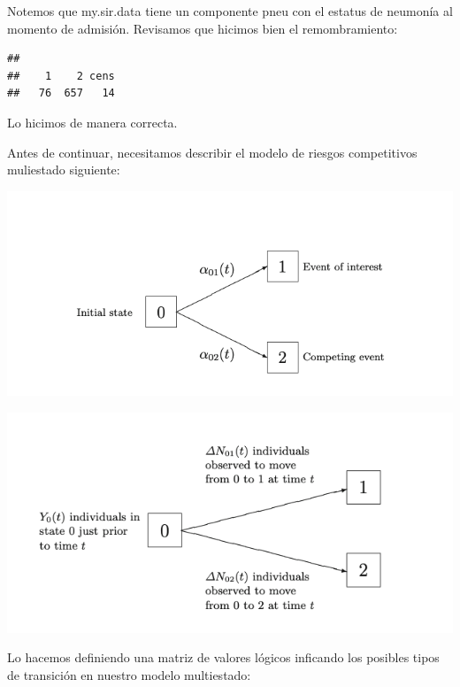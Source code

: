 \documentclass[
]{article}
\newenvironment{Shaded}{\begin{snugshade}}{\end{snugshade}}
\newcommand{\FunctionTok}[1]{\textcolor[rgb]{0.00,0.00,0.00}{#1}}
\newcommand{\NormalTok}[1]{#1}
\newcommand{\SpecialCharTok}[1]{\textcolor[rgb]{0.00,0.00,0.00}{#1}}
\begin{document}
Notemos que my.sir.data tiene un componente pneu con el estatus de
neumonía al momento de admisión. Revisamos que hicimos bien el
remombramiento:

\begin{Shaded}
\end{Shaded}

\begin{verbatim}
## 
##    1    2 cens 
##   76  657   14
\end{verbatim}

Lo hicimos de manera correcta.

Antes de continuar, necesitamos describir el modelo de riesgos
competitivos muliestado siguiente:

\includegraphics[width=1\linewidth]{Imagen1}

\includegraphics[width=1\linewidth]{Imagen_2}

Lo hacemos definiendo una matriz de valores lógicos inficando los
posibles tipos de transición en nuestro modelo multiestado:
\end{document}
